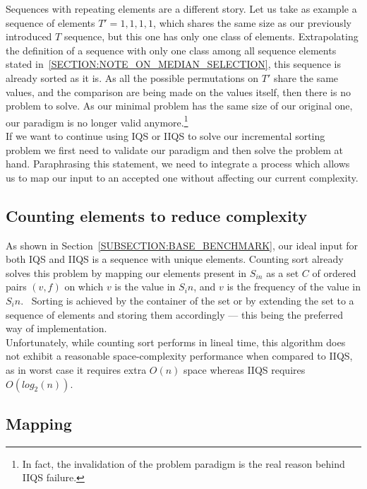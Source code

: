 Sequences with repeating elements are a different story. Let us take as example a sequence of elements $T'={1,1,1,1}$, which shares the same size as our previously introduced $T$ sequence, but this one has only one class of elements. Extrapolating the definition of a sequence with only one class among all sequence elements stated in~\ref{SECTION:NOTE_ON_MEDIAN_SELECTION}, this sequence is already sorted as it is. As all the possible permutations on $T'$ share the same values, and the comparison are being made on the values itself, then there is no problem to solve. As our minimal problem has the same size of our original one, our paradigm is no longer valid anymore.\footnote{In fact, the invalidation of the problem paradigm is the real reason behind IIQS failure.}\\

If we want to continue using IQS or IIQS to solve our incremental sorting problem we first need to validate our paradigm and then solve the problem at hand. Paraphrasing this statement, we need to integrate a process which allows us to map our input to an accepted one without affecting our current complexity.\\

\subsection{Counting elements to reduce complexity}

As shown in Section~\ref{SUBSECTION:BASE_BENCHMARK}, our ideal input for both IQS and IIQS is a sequence with unique elements. Counting sort already solves this problem by mapping our elements present in $S_{in}$ as a set $C$ of ordered pairs $(v,f)$ on which $v$ is the value in $S_in$, and $v$ is the frequency of the value in $S_in$.~\cite{10.5555/280635} Sorting is achieved by the container of the set or by extending the set to a sequence of elements and storing them accordingly --- this being the preferred way of implementation. \\

Unfortunately, while counting sort performs in lineal time, this algorithm does not exhibit a reasonable space-complexity performance when compared to IIQS, as in worst case it requires extra $O(n)$ space whereas IIQS requires $O(log_2(n))$.\\

\subsection{Mapping}
\label{SECTION:MAPPING}

